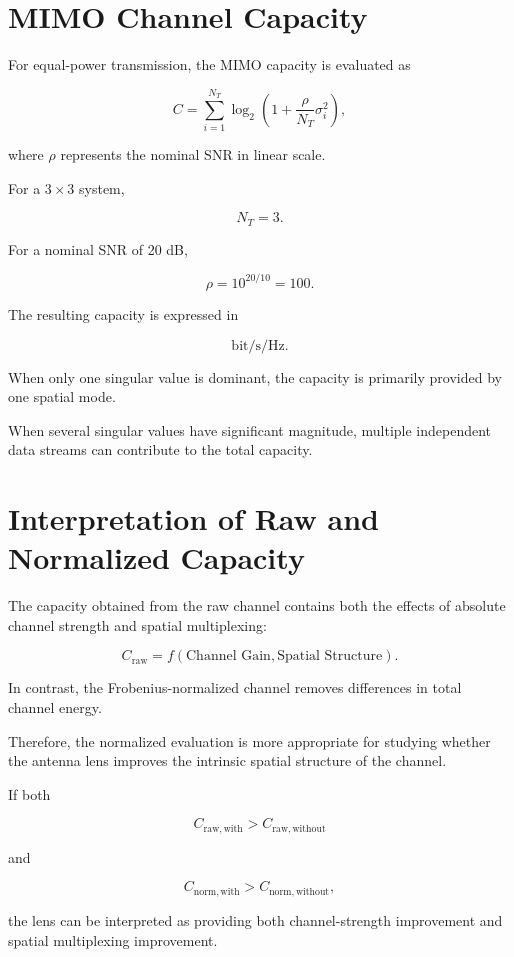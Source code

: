 \documentclass[11pt,a4paper]{article}
\begin{document}
\section{MIMO Channel Capacity}

For equal-power transmission, the MIMO capacity is evaluated as

\[
C
=
\sum_{i=1}^{N_T}
\log_2
\left(
1+
\frac{\rho}{N_T}
\sigma_i^2
\right),
\]

where $\rho$ represents the nominal SNR in linear scale.

For a $3\times3$ system,

\[
N_T=3.
\]

For a nominal SNR of 20 dB,

\[
\rho
=
10^{20/10}
=
100.
\]

The resulting capacity is expressed in

\[
\mathrm{bit/s/Hz}.
\]

When only one singular value is dominant, the capacity is primarily provided by one spatial mode.

When several singular values have significant magnitude, multiple independent data streams can contribute to the total capacity.

\section{Interpretation of Raw and Normalized Capacity}

The capacity obtained from the raw channel contains both the effects of absolute channel strength and spatial multiplexing:

\[
C_{\mathrm{raw}}
=
f
\left(
\text{Channel Gain},
\text{Spatial Structure}
\right).
\]

In contrast, the Frobenius-normalized channel removes differences in total channel energy.

Therefore, the normalized evaluation is more appropriate for studying whether the antenna lens improves the intrinsic spatial structure of the channel.

If both

\[
C_{\mathrm{raw,with}}
>
C_{\mathrm{raw,without}}
\]

and

\[
C_{\mathrm{norm,with}}
>
C_{\mathrm{norm,without}},
\]

the lens can be interpreted as providing both channel-strength improvement and spatial multiplexing improvement.
\end{document}
